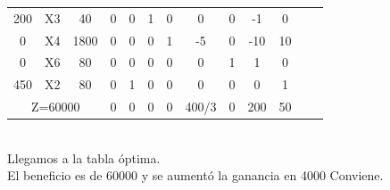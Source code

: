 \documentclass{article}
\begin{document}
\begin{enumerate}
\begin{tabular}{|c  c  c | c  c  c  c  c  c  c  c  c | c |}
			 200 & X3 & 40   & 0  & 0   & 1 & 0 & 0   & 0  & -1  & 0     & \\
			 0   & X4 & 1800 & 0  & 0   & 0 & 1 & -5  & 0  & -10 & 10    & \\ 
			 0   & X6 & 80   & 0  & 0   & 0 & 0 & 0   & 1  & 1   & 0     & \\
			 450   & X2 & 80   & 0  & 1   & 0 & 0 & 0   & 0  & 0   & 1     & \\ \hline
			 \multicolumn{3}{|c|}{Z=60000} & 0 & 0  & 0  & 0   & 400/3 & 0 & 200 & 50 &\\ \hline
		\end{tabular}
     	\smallskip\\
     	
		Llegamos a la tabla \'optima.\\
		El beneficio es de 60000 y se aumentó la ganancia en 4000 \Rightarrow   Conviene.\\
     	
\end{enumerate}
\end{document}
